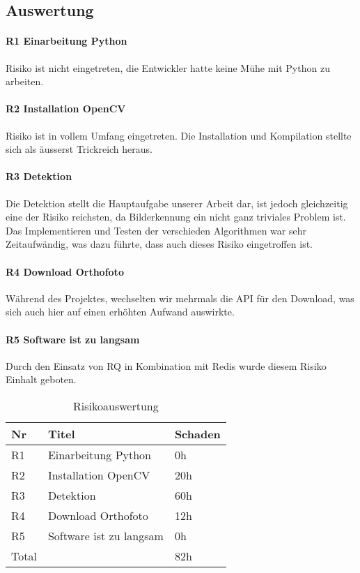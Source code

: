 \subsection{Auswertung}
\paragraph{R1	Einarbeitung Python}
Risiko ist nicht eingetreten, die Entwickler hatte keine Mühe mit Python zu arbeiten.

\paragraph{R2 Installation OpenCV}
Risiko ist in vollem Umfang eingetreten. Die Installation und Kompilation stellte sich als äusserst Trickreich heraus.

\paragraph{R3 Detektion}
Die Detektion stellt die Hauptaufgabe unserer Arbeit dar, ist jedoch gleichzeitig eine der Risiko reichsten, da Bilderkennung ein nicht ganz triviales Problem ist. Das Implementieren und Testen der verschieden Algorithmen war sehr Zeitaufwändig, was dazu führte, dass auch dieses Risiko eingetroffen ist.

\paragraph{R4 Download Orthofoto}
Während des Projektes, wechselten wir mehrmals die API für den Download, was sich auch hier auf einen erhöhten Aufwand auswirkte. 

\paragraph{R5 Software ist zu langsam}
Durch den Einsatz von RQ in Kombination mit Redis wurde diesem Risiko Einhalt geboten. \\

\begin{table}[H]
    \begin{tabular}{|p{2cm}|p{5cm}|p{2cm}|}
    \hline    
    \rowcolor{lightblue}
	Nr & Titel & Schaden \\ \hline   
	R1 & Einarbeitung Python & 0h \\ \hline
	R2 & Installation OpenCV & 20h \\ \hline
	R3 & Detektion & 60h \\ \hline
	R4 & Download Orthofoto & 12h \\ \hline
	R5 & Software ist zu langsam & 0h \\ \hline
	\rowcolor{lightblue}
	Total &  & 82h \\ \hline
    \end{tabular}
    \caption[Risikoauswertung]{Risikoauswertung}
\end{table}